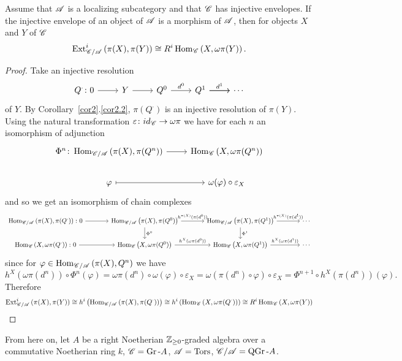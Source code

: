 \documentclass[dissertation.tex]{subfiles}
\begin{document}
\begin{cor}\label{cor3}
  Assume that $\mathscr{A}$ is a localizing subcategory and that $\mathscr{C}$ has injective envelopes.
  If the injective envelope of an object of $\mathscr{A}$ is a morphism of $\mathscr{A}$, then for objects $X$ and $Y$ of $\mathscr{C}$
  $$\operatorname{Ext}^{i}_{\mathscr{C}/\mathscr{A}}\left(\pi(X), \pi(Y)\right) \cong R^i \operatorname{Hom}_{\mathscr{C}}\left(X, \omega\pi(Y)\right).$$
  
  \begin{proof}
    Take an injective resolution
    $$\begin{tikzcd}
      Q^\cdot \colon 0 \arrow{r} & Y \arrow{r} & Q^0 \arrow{r}{d^0} & Q^1 \arrow{r}{d^1} \arrow{r} & \cdots 
    \end{tikzcd}$$
    of $Y$.
    By Corollary~\ref{cor2}.\ref{cor2.2}, $\pi(Q^\cdot)$ is an injective resolution of $\pi(Y)$.
    Using the natural transformation $\varepsilon \colon id_{\mathscr{C}} \rightarrow \omega\pi$ we have for each $n$ an isomorphism of adjunction
    $$\begin{tikzcd}
      \Phi^n \colon \Hom{\CC/\A}{\pi(X), \pi(Q^n)} \arrow{r} & \Hom{\CC}{X, \omega\pi(Q^n)}\\
      \varphi \arrow[mapsto]{r} & \omega(\varphi) \circ \varepsilon_X
    \end{tikzcd}$$
    and so we get an isomorphism of chain complexes
    $$\begin{tikzcd}[column sep=large]
      \Hom{\CC/\A}{\pi(X), \pi(Q^\cdot)} \colon 0 \arrow{r} & \Hom{\CC/\A}{\pi(X),\pi(Q^0)} \arrow{d}{\Phi^0}\arrow{r}{h^{\pi(X)}(\pi(d^0))} & \Hom{\CC/\A}{\pi(X), \pi(Q^1)}\arrow{d}{\Phi^1} \arrow{r}{h^{\pi(X)}(\pi(d^1))} & \cdots\\
      \Hom{\CC}{X, \omega\pi(Q^\cdot)} \colon 0 \arrow{r} & \Hom{\CC}{X,\omega\pi(Q^0)} \arrow{r}{h^X(\omega\pi(d^0))} & \Hom{\CC}{X, \omega\pi(Q^1)} \arrow{r}{h^X(\omega\pi(d^1))} & \cdots
    \end{tikzcd}$$
    since for $\varphi \in \operatorname{Hom}_{\mathscr{C}/\mathscr{A}}\left(\pi(X), Q^n\right)$ we have
    $$h^X(\omega\pi(d^n)) \circ \Phi^n(\varphi) = \omega\pi(d^n) \circ \omega(\varphi) \circ \varepsilon_X = \omega(\pi(d^n) \circ \varphi) \circ \varepsilon_X = \Phi^{n+1} \circ h^X(\pi(d^n))(\varphi).$$
    Therefore 
    $$\operatorname{Ext}^{i}_{\mathscr{C}/\mathscr{A}}\left(\pi(X), \pi(Y)\right) \cong h^i\left(\operatorname{Hom}_{\mathscr{C}/\mathscr{A}}\left(\pi(X), \pi(Q^\cdot)\right)\right) \cong h^i\left(\operatorname{Hom}_{\mathscr{C}}\left(X, \omega\pi(Q^\cdot)\right)\right) \cong R^i \operatorname{Hom}_{\mathscr{C}}\left(X, \omega\pi(Y)\right)$$
  \end{proof}
\end{cor}

From here on, let $A$ be a right Noetherian $\mathbb{Z}_{\geq 0}$-graded algebra over a commutative Noetherian ring $k$, $\mathscr{C} = \operatorname{Gr}\text{-}A$, $\mathscr{A} = \operatorname{Tors}$, $\mathscr{C}/\mathscr{A} = \operatorname{QGr}\text{-}A$.
\end{document}

